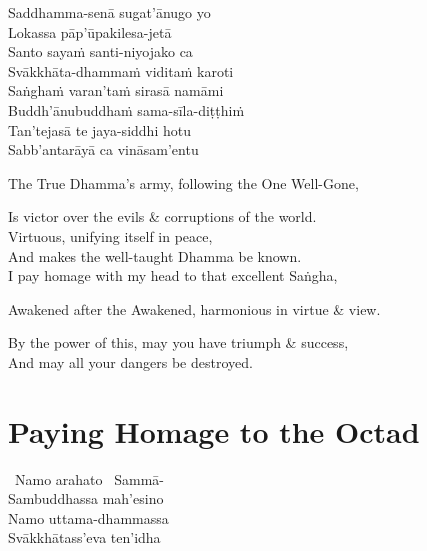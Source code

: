 \ifninebythirteen\clearpage\fi

\begin{pali-hang-continued}
  Saddhamma-senā sugat'ānugo yo\\
  Lokassa pāp'ūpakilesa-jetā\\
  Santo sayaṁ santi-niyojako ca\\
  Svākkhāta-dhammaṁ viditaṁ karoti\\
  Saṅghaṁ varan'taṁ sirasā namāmi\\
  Buddh'ānubuddhaṁ sama-sīla-diṭṭhiṁ\\
  Tan'tejasā te jaya-siddhi hotu\\
  Sabb'antarāyā ca vināsam'entu
\end{pali-hang-continued}

\begin{english-verses}
  \begin{english-hang-first-line}
  The True Dhamma's army, following the One Well-Gone,\\
  \end{english-hang-first-line}
  Is victor over the evils \& corruptions of the world.\\
  Virtuous, unifying itself in peace,\\
  And makes the well-taught Dhamma be known.\\
  I pay homage with my head to that excellent Saṅgha,\\
  \begin{english-hang-together-verses}
  Awakened after the Awakened, harmonious in virtue \& view.\\
  \end{english-hang-together-verses}
  By the power of this, may you have triumph \& success,\\
  And may all your dangers be destroyed.
\end{english-verses}

\suttaRef{[Thai]}



\section{Paying Homage to the Octad}
\label{paying-homage-to-octad}

\begin{pali-hang-together}
  \anglebracketleft\ \hspace{-0.5mm}Namo arahato \hspace{-0.5mm}\anglebracketright\ Sammā-\\
  Sambuddhassa mah'esino\\
  Namo uttama-dhammassa\\
  Svākkhātass'eva ten'idha
\end{pali-hang-together}

